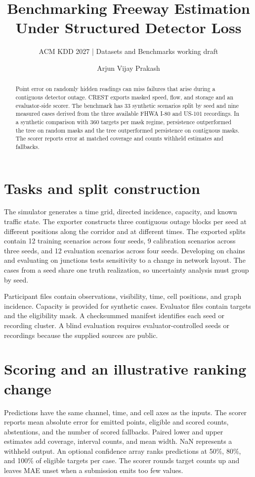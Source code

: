 \documentclass[sigconf,nonacm]{acmart}
\title{Benchmarking Freeway Estimation Under Structured Detector Loss}
\subtitle{ACM KDD 2027 | Datasets and Benchmarks working draft}
\author{Arjun Vijay Prakash}
\affiliation{\institution{Independent Researcher}\city{ }\country{ }}
\begin{document}
\begin{abstract}
Point error on randomly hidden readings can miss failures that arise during a contiguous
detector outage. CREST exports masked speed, flow, and storage and an evaluator-side scorer.
The benchmark has 33 synthetic scenarios split by seed and nine measured cases derived from
the three available FHWA I-80 and US-101 recordings. In a synthetic comparison with 360 targets
per mask regime, persistence outperformed the tree on random masks and the tree outperformed
persistence on contiguous masks. The scorer reports error at matched coverage and counts
withheld estimates and fallbacks.
\end{abstract}

\maketitle

\section*{Tasks and split construction}
The simulator generates a time grid, directed incidence, capacity, and known traffic state. The
exporter constructs three contiguous outage blocks per seed at different positions along the
corridor and at different times. The exported splits contain 12 training scenarios across four
seeds, 9 calibration scenarios across three seeds, and 12 evaluation scenarios across four
seeds. Developing on chains and evaluating on junctions tests sensitivity to a change in network
layout. The cases from a seed share one truth realization, so uncertainty analysis must group by
seed.

Participant files contain observations, visibility, time, cell positions, and graph incidence.
Capacity is provided for synthetic cases. Evaluator files contain targets and the eligibility
mask. A checksummed manifest identifies each seed or recording cluster. A blind evaluation
requires evaluator-controlled seeds or recordings because the supplied sources are public.

\section*{Scoring and an illustrative ranking change}
Predictions have the same channel, time, and cell axes as the inputs. The scorer reports mean
absolute error for emitted points, eligible and scored counts, abstentions, and the number of
scored fallbacks. Paired lower and upper estimates add coverage, interval counts, and mean
width. NaN represents a withheld output. An optional confidence array ranks predictions at
50\%, 80\%, and 100\% of eligible targets per case. The scorer rounds target counts up and
leaves MAE unset when a submission emits too few values.
\end{document}
